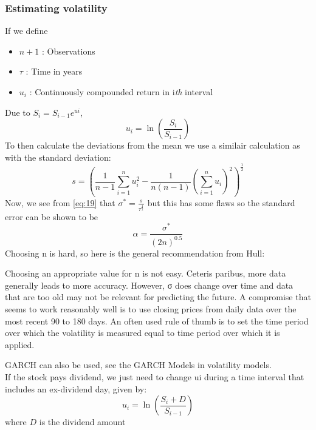 \documentclass{article}
\begin{document}
\subsubsection{Estimating volatility}
If we define
\begin{itemize}
    \item $n+1$ : Observations
    \item $\tau$ : Time in years
    \item $u_{i}$ : Continuously compounded return in i\emph{th} interval
\end{itemize}
Due to $S_{i}= S_{i-1} e^{ui}$,
\begin{equation}
    u_{i} = \ln \left(\frac{S_{i}}{S_{i-1}}\right)
\end{equation}
To then calculate the deviations from the mean we use a similair calculation as with the standard deviation:
\begin{equation*}
    s = \left(\frac{1}{n-1} \sum_{i=1}^{n}u_{i}^{2} - \frac{1}{n(n-1)}\left(\sum_{i=1}^{n}u_{i}\right)^{2}\right)^\frac{1}{2}
\end{equation*}
Now, we see from \ref{eq:19} that $\sigma ^{*} = \frac{s}{\tau^{\frac{1}{2}}}$ but this has some flaws so the standard error can be shown to be
\begin{equation}
    \alpha = \frac{\sigma ^ {*}}{(2n)^{0.5}}
\end{equation}
Choosing n is hard, so here is the general recommendation from Hull:
\begin{displayquote}
Choosing an appropriate value for n is not easy. Ceteris paribus, more data generally leads to more accuracy. However, σ does change over time and data that are too old may not be relevant for predicting the future. A compromise that seems to work reasonably well is to use closing prices from daily data over the most recent 90 to 180 days. An often used rule of thumb is to set the time period over which the volatility is measured equal to time period over which it is applied.
\end{displayquote}
GARCH can also be used, see the GARCH Models in volatility models. \\
If the stock pays dividend, we just need to change ui during a time interval that includes an ex-dividend day, given by:
\begin{equation}
    u_{i} = \ln \left(\frac{S_{i}+D}{S_{i-1}}\right)
\end{equation}
where $D$ is the dividend amount
\end{document}
